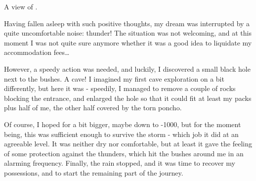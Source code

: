 \begin{marginfigure}
\checkoddpage \ifoddpage \forcerectofloat \else \forceversofloat \fi
\centering
 \caption{A view of \protect{}. }
 \label{bohinj gergely}
\end{marginfigure}

Having fallen asleep with such positive thoughts, my dream was
interrupted by a quite uncomfortable noise: thunder! The situation was
not welcoming, and at this moment I was not quite sure anymore whether
it was a good idea to liquidate my accommodation fees\ldots{}

However, a speedy action was needed, and luckily, I discovered a small
black hole next to the bushes. A cave! I imagined my first cave
exploration on  a bit differently, but here it was - speedily, I
managed to remove a couple of rocks blocking the entrance, and enlarged
the hole so that it could fit at least my packs plus half of me, the
other half covered by the torn poncho.

Of course, I hoped for a bit bigger, maybe down to -1000, but for the
moment being, this was sufficient enough to survive the storm - which
job it did at an agreeable level. It was neither dry nor comfortable,
but at least it gave the feeling of some protection against the
thunders, which hit the bushes around me in an alarming frequency.
Finally, the rain stopped, and it was time to recover my possessions,
and to start the remaining part of the journey.

